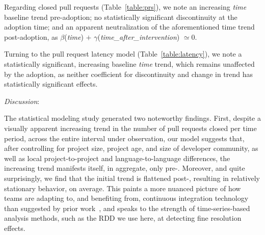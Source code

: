 Regarding closed pull requests (Table~\ref{table:prs}), we note an increasing
\emph{time} baseline trend pre-adoption; no statistically significant discontinuity
at the adoption time; and an apparent neutralization of the aforementioned time
trend post-adoption, as $\beta$(\emph{time}) $+$ 
$\gamma$(\emph{time\_after\_intervention}) $\simeq 0$.

Turning to the pull request latency model (Table~\ref{table:latency}), we note
a statistically significant, increasing baseline \emph{time} trend, which remains
unaffected by the \Tvis adoption, as neither coefficient for discontinuity and
change in trend has statistically significant effects.



\smallskip\noindent \emph{Discussion}:

The statistical modeling study generated two noteworthy findings.
First, despite a visually apparent increasing trend in the number of pull requests 
closed per time period, across the entire interval under observation, our model 
suggests that, after controlling for project size, project age, and size of developer 
community, as well as local project-to-project and language-to-language differences, 
the increasing trend manifests itself, in aggregate, only pre-\Tvi.
Moreover, and quite surprisingly, we find that the initial trend is flattened post-\Tvi,
resulting in relatively stationary behavior, on average.
This paints a more nuanced picture of how \GH teams are adapting to, and
benefiting from, continuous integration technology than suggested by prior
work~\cite{VasilescuYWDF15}, and speaks to the strength of time-series-based
analysis methods, such as the RDD we use here, at detecting fine resolution effects.

